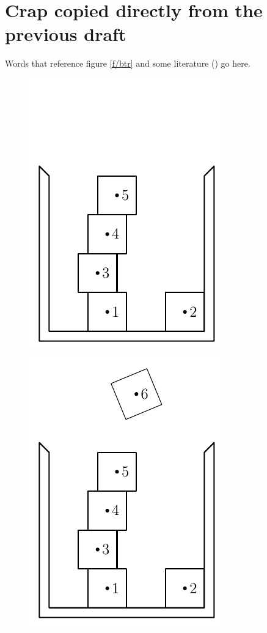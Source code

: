 \documentclass[12pt, sumlimits, intlimits]{article}
\begin{document}
\section{Crap copied directly from the previous draft}

Words that reference figure \ref{f/btr} and
some literature (\cite{conway-1998}) go here.

\begin{figure}
\centering
\def \w{0.25\columnwidth}
\includegraphics[width=\w]{btr-0}%
\includegraphics[width=\w]{btr-1}%

\end{figure}
\end{document}
